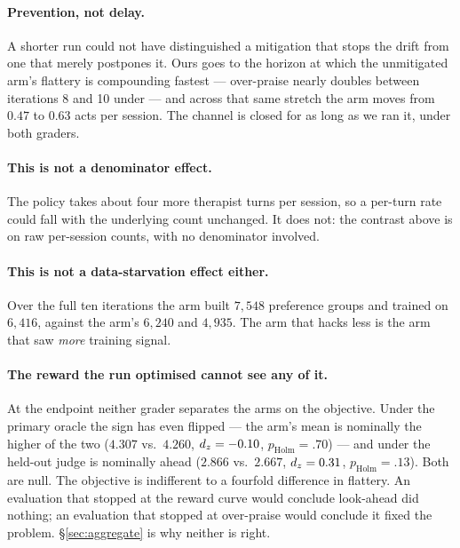 \paragraph{Prevention, not delay.} A shorter run could not have distinguished a mitigation that
stops the drift from one that merely postpones it. Ours goes to the horizon at which the
unmitigated arm's flattery is compounding fastest --- over-praise nearly doubles between
iterations 8 and 10 under \Kz{} --- and across that same stretch the \Kf{} arm moves from $0.47$ to
$0.63$ acts per session. The channel is closed for as long as we ran it, under both graders.

\paragraph{This is not a denominator effect.} The \Kf{} policy takes about four more therapist
turns per session, so a per-turn rate could fall with the underlying count unchanged. It does not:
the contrast above is on raw per-session counts, with no denominator involved.

\paragraph{This is not a data-starvation effect either.} Over the full ten iterations the \Kf{} arm
built $7{,}548$ preference groups and trained on $6{,}416$, against the \Kz{} arm's $6{,}240$ and
$4{,}935$. The arm that hacks less is the arm that saw \emph{more} training signal.

\paragraph{The reward the run optimised cannot see any of it.} At the endpoint neither grader
separates the arms on the objective. Under the primary oracle the sign has even flipped --- the
\Kf{} arm's \QQ{} mean is nominally the higher of the two ($4.307$ vs.\ $4.260$, $d_z{}=-0.10$,
$p_{\text{Holm}}{=}.70$) --- and under the held-out judge \Kz{} is nominally ahead
($2.866$ vs.\ $2.667$, $d_z{}=0.31$, $p_{\text{Holm}}{=}.13$). Both are null. The objective is
indifferent to a fourfold difference in flattery. An evaluation that stopped at the reward curve
would conclude look-ahead did nothing; an evaluation that stopped at over-praise would conclude it
fixed the problem. \S\ref{sec:aggregate} is why neither is right.
